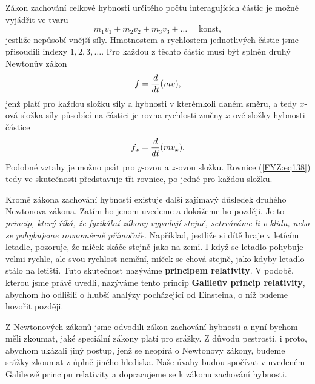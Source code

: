     Zákon zachování celkové hybnosti určitého počtu interagujících částic je možné vyjádřit ve tvaru
    \begin{equation}\label{FYZ:eq138}
      m_1v_1 + m_2v_2 + m_3v_3 + \ldots = \text{konst},
    \end{equation}
    jestliže nepůsobí vnější síly. Hmotnostem a rychlostem jednotlivých částic jsme přisoudili 
    indexy \(1, 2, 3, \ldots\). Pro každou z těchto částic musí být splněn druhý Newtonův zákon
    \begin{equation}\label{FYZ:eq139}
      f = \dfrac{d  }{d t}(mv),
    \end{equation}
    jenž platí pro každou složku síly a hybnosti v kterémkoli daném směru, a tedy \(x\)-ová složka 
    síly působící na částici je rovna rychlosti změny \(x\)-ové složky hybnosti částice
    \begin{equation}\label{FYZ:eq140}
      f_x = \dfrac{d  }{d t}(mv_x).
    \end{equation}
    Podobné vztahy je možno psát pro \(y\)-ovou a \(z\)-ovou složku. Rovnice (\ref{FYZ:eq138}) tedy 
    ve skutečnosti představuje tři rovnice, po jedné pro každou složku.
    
    Kromě zákona zachování hybnosti existuje další zajímavý důsledek druhého Newtonova zákona. 
    Zatím ho jenom uvedeme a dokážeme ho později. Je to \emph{princip, který říká, že fyzikální 
    zákony vypadají stejně, setrváváme-li v klidu, nebo se pohybujeme rovnoměrně přímočaře}. 
    Například, jestliže si dítě hraje v letícím letadle, pozoruje, že míček skáče stejně jako na 
    zemi. I když se letadlo pohybuje velmi rychle, ale svou rychlost nemění, míček se chová stejně, 
    jako kdyby letadlo stálo na letišti. Tuto skutečnost nazýváme \textbf{principem relativity}. V 
    podobě, kterou jsme právě uvedli, nazýváme tento princip \textbf{Galileův princip relativity}, 
    abychom ho odlišili o hlubší analýzy pocházející od Einsteina, o níž budeme hovořit později.
    
    Z Newtonových zákonů jsme odvodili zákon zachování hybnosti a nyní bychom měli zkoumat, jaké 
    speciální zákony platí pro srážky. Z důvodu pestrosti, i proto, abychom ukázali jiný postup, 
    jenž se neopírá o Newtonovy zákony, budeme srážky zkoumat z úplně jiného hlediska. Naše úvahy 
    budou spočívat v uvedeném Galileově principu relativity a dopracujeme se k zákonu zachování 
    hybnosti.
    
